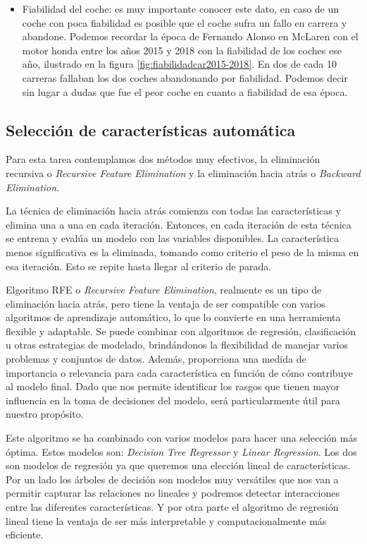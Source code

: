 \begin{itemize}
    \item Fiabilidad del coche: es muy importante conocer este dato, en caso de un coche con poca fiabilidad es posible que el coche sufra un fallo en carrera y abandone. Podemos recordar la época de Fernando Alonso en McLaren con el motor honda entre los años 2015 y 2018 con la fiabilidad de los coches ese año, ilustrado en la figura \ref{fig:fiabilidadcar2015-2018}. En dos de cada 10 carreras fallaban los dos coches abandonando por fiabilidad. Podemos decir sin lugar a dudas que fue el peor coche en cuanto a fiabilidad de esa época.
\end{itemize} 

\subsection{Selección de características automática}

Para esta tarea contemplamos dos métodos muy efectivos, la eliminación recursiva o \textit{Recursive Feature Elimination} y la eliminación hacia atrás o \textit{Backward Elimination}.

La técnica de eliminación hacia atrás comienza con todas las características y elimina una a una en cada iteración. Entonces, en cada iteración de esta técnica se entrena y evalúa un modelo con las variables disponibles. La característica menos significativa es la eliminada, tomando como criterio el peso de la misma en esa iteración. Esto se repite hasta llegar al criterio de parada.

Elgoritmo RFE o \textit{Recursive Feature Elimination}, realmente es un tipo de eliminación hacia atrás, pero tiene la ventaja de ser compatible con varios algoritmos de aprendizaje automático, lo que lo convierte en una herramienta flexible y adaptable. Se puede combinar con algoritmos de regresión, clasificación u otras estrategias de modelado, brindándonos la flexibilidad de manejar varios problemas y conjuntos de datos. Además, proporciona una medida de importancia o relevancia para cada característica en función de cómo contribuye al modelo final. Dado que nos permite identificar los rasgos que tienen mayor influencia en la toma de decisiones del modelo, será particularmente útil para nuestro propósito.

Este algoritmo se ha combinado con varios modelos para hacer una selección más óptima. Estos modelos son: \textit{Decision Tree Regressor} y \textit{Linear Regression}. Los dos son modelos de regresión ya que queremos una elección lineal de características. Por un lado los árboles de decisión son modelos muy versátiles que nos van a permitir capturar las relaciones no lineales y podremos detectar interacciones entre las diferentes características. Y por otra parte el algoritmo de regresión lineal tiene la ventaja de ser más interpretable y computacionalmente más eficiente.

